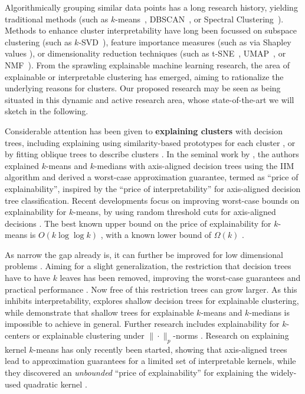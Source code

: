 \documentclass[a4paper,11pt]{article}
\begin{document}
Algorithmically grouping similar data points has a long research history,
yielding traditional methods (such as $k$-means~\cite{todo}, DBSCAN~\cite{todo}, or Spectral Clustering~\cite{todo}).
Methods to enhance cluster interpretability have long been focussed on subspace clustering (such as $k$-SVD~\cite{}), feature importance measures (such as via Shapley values \cite{}), or dimensionality reduction techniques (such as t-SNE~\cite{}, UMAP~\cite{}, or NMF~\cite{}).
From the sprawling explainable machine learning research, the area of explainable or interpretable clustering has emerged, aiming to rationalize the underlying reasons for clusters. 
Our proposed research may be seen as being situated in this dynamic and active research area, whose state-of-the-art we will sketch in the following. 

Considerable attention has been given to \textbf{explaining clusters} with decision trees, including explaining using similarity-based prototypes for each cluster \cite{carrizosa2022interpreting}, or by fitting oblique trees to describe clusters \cite{gabidolla2022optimal}.
In the seminal work by \citet{moshkovitz2020explainable}, the authors explained $k$-means and $k$-medians with axis-aligned decision trees using the IIM algorithm and derived a worst-case approximation guarantee, termed as ``price of explainability'', inspired by the ``price of interpretability'' \cite{bertsimas2019price} for axis-aligned decision tree classification. 
Recent developments focus on improving worst-case bounds on explainability for $k$-means, by using random threshold cuts for axis-aligned decisions \cite{makarychev2022explainable, esfandiari2022almost, makarychev2023random}. 
The best known upper bound on the price of explainability for $k$-means is $O(k \log \log k)$ \cite{gupta2023price}, with a known lower bound of $\Omega(k)$ \cite{gamlath2021explainable}.

As narrow the gap already is, it can further be improved for low dimensional problems \cite{laber2021price, charikar2022near}. 
Aiming for a slight generalization, the restriction that decision trees have to have $k$ leaves has been removed, improving the worst-case guarantees \cite{makarychev2022explainable} and practical performance \cite{frost2020exkmc}. 
Now free of this restriction trees can grow larger.
As this inhibits interpretability, \citet{laber2023nearly} explores shallow decision trees for explainable clustering, while \citet{deng2023impossibility} demonstrate that shallow trees for explainable $k$-means and $k$-medians is impossible to achieve in general. 
Further research includes explainability for $k$-centers \cite{laber2021} or explainable clustering under $\|\cdot\|_p$-norms \cite{gamlath2021explainable}. 
Research on explaining kernel $k$-means has only recently been started, showing that axis-aligned trees lead to approximation guarantees for a limited set of interpretable kernels, while they discovered an \emph{unbounded} ``price of explainability'' for explaining the widely-used quadratic kernel \cite{fleissner2024explaining}.
\end{document}
